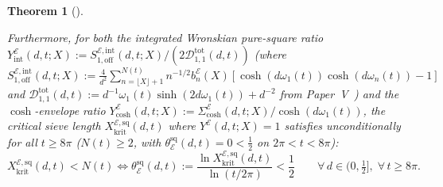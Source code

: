 \documentclass[11pt,reqno]{amsart}
\newtheorem{theorem}{Theorem}[section]
\theoremstyle{definition}
\theoremstyle{remark}
\numberwithin{equation}{section}
\begin{document}
\begin{theorem}[{Power-Law $L^2$ Damping on $(X, X^2]
\begin{enumerate}[label=\textup{(\alph*)},leftmargin=2.2em]
Furthermore, for both the integrated Wronskian pure-square ratio $Y_{\mathrm{int}}^{\mathcal{E}}(d,t;X) :=\allowbreak S_{1,\mathrm{off}}^{\mathcal{E},\mathrm{int}}(d,t;X)/\allowbreak(2\mathcal{D}_{1,1}^{\mathrm{tot}}(d,t))$ (where $S_{1,\mathrm{off}}^{\mathcal{E},\mathrm{int}}(d,t;X) :=\allowbreak \frac{4}{d^2}\sum_{n=\lfloor X\rfloor+1}^{N(t)} n^{-1/2}b_n^{\mathcal{E}}(X)[\cosh(d\omega_1(t))\allowbreak\cosh(d\omega_n(t)) - 1]$ and $\mathcal{D}_{1,1}^{\mathrm{tot}}(d,t) :=\allowbreak d^{-1}\omega_1(t)\sinh(2d\omega_1(t)) + d^{-2}$ from Paper~V~\cite{missiaen2026paper5}) and the $\cosh$-envelope ratio $Y_{\cosh}^{\mathcal{E}}(d,t;X) :=\allowbreak \Sigma_{\cosh}^{\mathcal{E}}(d,t;X)/\allowbreak\cosh(d\omega_1(t))$, the critical sieve length $X_{\mathrm{krit}}^{\mathcal{E},\mathrm{sq}}(d,t)$ where $Y^{\mathcal{E}}(d,t;X) = 1$ satisfies unconditionally for all $t \ge 8\pi$ ($N(t) \ge 2$, with $\theta_{\mathcal{E}}^{\mathrm{sq}}(d,t) = 0 < \frac{1}{2}$ on $2\pi < t < 8\pi$):
\begin{equation}\label{eq:universal_sub_selberg}
X_{\mathrm{krit}}^{\mathcal{E},\mathrm{sq}}(d,t) < N(t) \iff \theta_{\mathcal{E}}^{\mathrm{sq}}(d,t) := \frac{\ln X_{\mathrm{krit}}^{\mathcal{E},\mathrm{sq}}(d,t)}{\ln(t/2\pi)} < \frac{1}{2} \qquad \forall\, d \in \bigl(0, \tfrac{1}{2}\bigr],\; \forall\, t \ge 8\pi.
\end{equation}
\end{enumerate}
\end{theorem}
\end{document}
